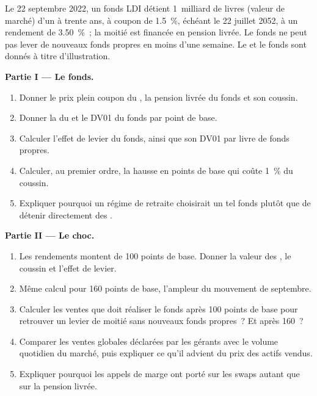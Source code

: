 \begin{problem}\label{pb:m2:european-and-japanese-government-bonds:1}
Le 22 septembre 2022, un fonds LDI détient 1~milliard de livres (valeur de marché)
d'un  à trente ans, à coupon de 1.5~\%, échéant le 22 juillet 2052, à un rendement de
3.50~\%~; la moitié est financée en pension livrée. Le fonds ne peut pas lever de nouveaux fonds propres en moins
d'une semaine. Le  et le fonds sont donnés à titre d'illustration.

\medskip\noindent\textbf{Partie I --- Le fonds.}
\begin{enumerate}
\item Donner le prix plein coupon du , la pension livrée du fonds et son coussin.
\item Donner la  du  et le DV01 du fonds par point de base.
\item Calculer l'effet de levier du fonds, ainsi que son DV01 par livre de fonds propres.
\item Calculer, au premier ordre, la hausse en points de base qui coûte 1~\% du coussin.
\item Expliquer pourquoi un régime de retraite choisirait un tel fonds plutôt que de détenir
directement des .
\end{enumerate}

\medskip\noindent\textbf{Partie II --- Le choc.}
\begin{enumerate}[resume]
\item Les rendements montent de 100 points de base. Donner la valeur des , le coussin et
l'effet de levier.
\item Même calcul pour 160 points de base, l'ampleur du mouvement de septembre.
\item Calculer les ventes que doit réaliser le fonds après 100 points de base pour retrouver
un levier de moitié sans nouveaux fonds propres~? Et après 160~?
\item Comparer les ventes globales déclarées par les gérants avec le volume quotidien
du marché, puis expliquer ce qu'il advient du prix des actifs vendus.
\item Expliquer pourquoi les appels de marge ont porté sur les swaps autant que sur la pension livrée.
\end{enumerate}


\end{problem}
